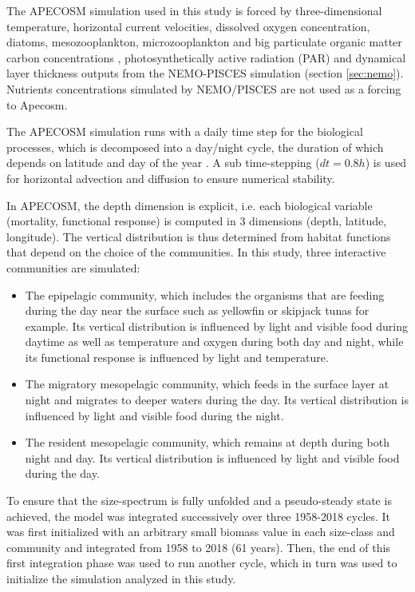 The APECOSM simulation used in this study is forced by three-dimensional temperature, horizontal current velocities, dissolved oxygen concentration, diatoms, mesozooplankton, microzooplankton and big particulate organic matter carbon concentrations \citep{aumontPISCESv2OceanBiogeochemical2015}, photosynthetically active radiation (PAR) and dynamical layer thickness outputs from the NEMO-PISCES simulation (section \ref{sec:nemo}). Nutrients concentrations simulated by NEMO/PISCES are not used as a forcing to Apecosm.

The APECOSM simulation runs with a daily time step for the biological processes, which is decomposed into a day/night cycle, the duration of which  depends on latitude and day of the year \citep{forsytheModelComparisonDaylength1995}. A sub time-stepping ($dt =0.8h$) is used for horizontal advection and diffusion to ensure numerical stability.

In APECOSM, the depth dimension is explicit, i.e. each biological variable (mortality, functional response) is computed in 3 dimensions (depth, latitude, longitude). The vertical distribution is thus determined from habitat functions that depend on the choice of the communities. In this study, three interactive communities are simulated:
\begin{itemize}
\item{The epipelagic community, which includes the organisms that are feeding during the day near the surface such as yellowfin or skipjack tunas for example. Its vertical distribution is influenced by light and visible food during daytime as well as temperature and oxygen during both day and night, while its functional response is influenced by light and temperature.}
\item{The migratory mesopelagic community, which feeds in the surface layer at night and migrates to deeper waters during the day. Its vertical distribution is influenced by light and visible food during the night.}
\item{The resident mesopelagic community, which remains at depth during both night and day. Its vertical distribution is influenced by light and visible food during the day.}
\end{itemize}

To ensure that the size-spectrum is fully unfolded and a pseudo-steady state is achieved, the model was integrated successively over three 1958-2018 cycles. It was first initialized with an arbitrary small biomass value in each size-class and community and integrated from 1958 to 2018 (61 years). Then, the end of this first integration phase was used to run another cycle, which in turn was used to initialize the simulation analyzed in this study.

